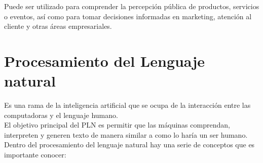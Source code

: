 Puede ser utilizado para comprender la percepción pública 
de productos, servicios o eventos, así como para tomar 
decisiones informadas en marketing, atención al cliente y 
otras áreas empresariales.

\section{Procesamiento del Lenguaje natural}
Es una rama de la inteligencia artificial que se ocupa de la interacción 
entre las computadoras y el lenguaje humano. \\
El objetivo principal del PLN es permitir que las máquinas comprendan, 
interpreten y generen texto de manera similar a como lo haría un ser humano.\\
Dentro del procesamiento del lenguaje natural hay una serie de conceptos que es importante conocer:
